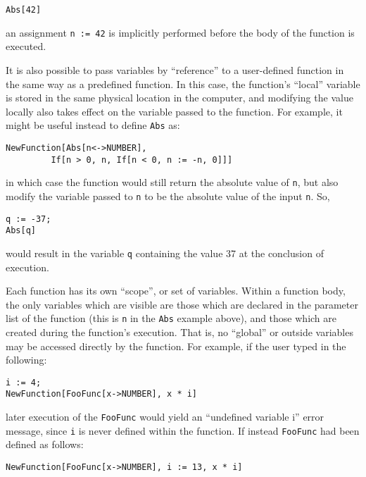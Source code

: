 \begin{verbatim}
Abs[42]
\end{verbatim}

\noindent an assignment \verb+n := 42+ is implicitly performed before
the body of the function is executed.

It is also possible to pass variables by ``reference'' to a
user-defined function in the same way as a predefined function.  In
this case, the function's ``local'' variable is stored in the same
physical location in the computer, and modifying the value locally
also takes effect on the variable passed to the function.  For
example, it might be useful instead to define \verb+Abs+ as:

\begin{verbatim}
NewFunction[Abs[n<->NUMBER],
		 If[n > 0, n, If[n < 0, n := -n, 0]]]
\end{verbatim}

\noindent in which case the function would still return the absolute
value of \verb+n+, but also modify the variable passed to \verb+n+ to
be the absolute value of the input \verb+n+.  So,

\begin{verbatim}
q := -37;
Abs[q]
\end{verbatim}

\noindent would result in the variable \verb+q+ containing the value
37 at the conclusion of execution.

Each function has its own ``scope'', or set of variables.  Within a
function body, the only variables which are visible are those which
are declared in the parameter list of the function (this is \verb+n+
in the \verb+Abs+ example above), and those which are created during
the function's execution.  That is, no ``global'' or outside variables
may be accessed directly by the function.  For example, if the user
typed in the following:

\begin{verbatim}
i := 4;
NewFunction[FooFunc[x->NUMBER], x * i]
\end{verbatim}

\noindent later execution of the \verb+FooFunc+ would yield an
``undefined variable i'' error message, since \verb+i+ is never
defined within the function.  If instead \verb+FooFunc+ had been
defined as follows:

\begin{verbatim}
NewFunction[FooFunc[x->NUMBER], i := 13, x * i]
\end{verbatim}

